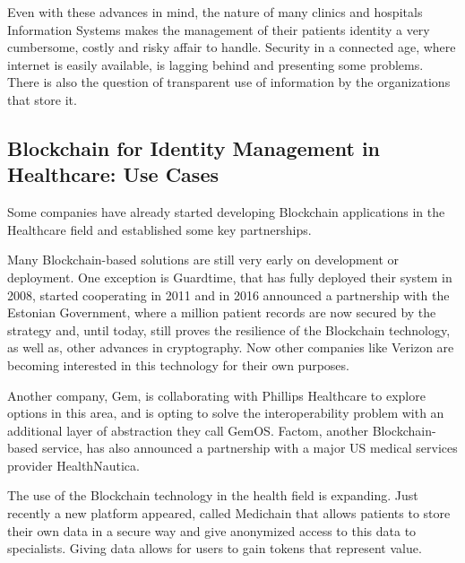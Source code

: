 Even with these advances in mind, the nature of many clinics and hospitals
Information Systems makes the management of their patients identity a very
cumbersome, costly and risky affair to handle.  Security in a connected age,
where internet is easily available, is lagging behind and presenting some
problems.  There is also the question of transparent use of information by the
organizations that store it.
%

\subsection{Blockchain for Identity Management in Healthcare: Use Cases} Some
companies have already started developing Blockchain applications in the
Healthcare field and established some key partnerships.

Many Blockchain-based solutions are still very early on development or
deployment.  One exception is Guardtime, that has fully deployed their system
in 2008, started cooperating in 2011 and in 2016 announced a partnership with
the Estonian Government, where a million patient records are now secured by the
strategy and, until today, still proves the resilience of the Blockchain
technology, as well as, other advances in cryptography.  Now other companies
like Verizon are becoming interested in this technology for their own purposes.
\cite{GuardTime2018,EstonianGovernmentGuardTime2016}

Another company, Gem, is collaborating with Phillips Healthcare to explore
options in this area, and is opting to solve the interoperability problem with
an additional layer of abstraction they call GemOS.  Factom, another
Blockchain-based service, has also announced a partnership with a major US
medical services provider
HealthNautica.\cite{BlockchainCompHealth2017,FactomPartnership2017}

The use of the Blockchain technology in the health field is expanding. Just
recently a new platform appeared, called Medichain that allows patients to
store their own data in a secure way and give anonymized access to this data to
specialists. Giving data allows for users to gain tokens that represent value.
\cite{MediChain2018}
